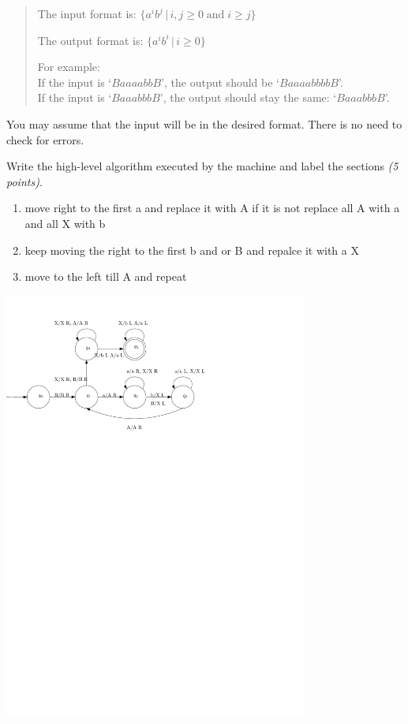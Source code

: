 \documentclass[12pt]{article}
\begin{document}
\begin{quote}
The input format is: $\{ a^i b^j \,|\, i,j \geq 0 \; \mbox{and} \;
                                         i \geq j \}$

The output format is: $\{ a^i b^i \,|\, i \geq 0 \}$

For example:\\
If the input is `$BaaaabbB$', the output should be `$BaaaabbbbB$'. \\
If the input is `$BaaabbbB$', the output should stay the same:
`$BaaabbbB$'.

\end{quote}

You may assume that the input will be in the desired format. There is no
need to check for errors.

Write the high-level algorithm executed by the machine and label the
sections {\em (5 points)}.
\begin{enumerate}
\item move right to the first a and replace it with A if it is not replace all A with a and all X with b
\item keep moving the right to the first b and or B and repalce it with a X
\item move to the left till A and repeat   
\end{enumerate}


\begin{center}
\includegraphics[width=0.75\textwidth]{TM1.pdf}
\end{center}
\end{document}
